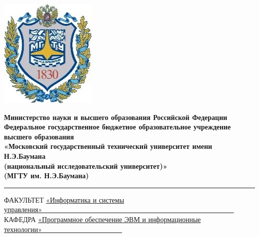 \begin{titlepage}
    \fontsize{12pt}{12pt}\selectfont
	\noindent \begin{minipage}{0.15\textwidth}
		\includegraphics[width=\linewidth]{img/logo.jpg}
	\end{minipage}
	\noindent\begin{minipage}{0.9\textwidth}\centering
		\textbf{Министерство науки и высшего образования Российской Федерации}\\
		\textbf{Федеральное государственное бюджетное образовательное учреждение высшего образования}\\
		\textbf{«Московский государственный технический университет имени Н.Э.Баумана}\\
		\textbf{(национальный исследовательский университет)»}\\
		\textbf{(МГТУ им. Н.Э.Баумана)}
	\end{minipage}
 \noindent\rule{18cm}{3pt}
	\newline\newline
	\noindent ФАКУЛЬТЕТ \underline{«Информатика и системы управления»~~~~~~~~~~~~~~~~~~~~~~~~~~~~~~~~~~~~~~~~~~~~~~~~~~~~~~~} \newline\newline
	\noindent КАФЕДРА \underline{«Программное обеспечение ЭВМ и информационные технологии»~~~~~~~~~~~~~~~~~~~~~~~}\newline\newline\newline\newline\newline\newline\newline
	

\end{titlepage}
